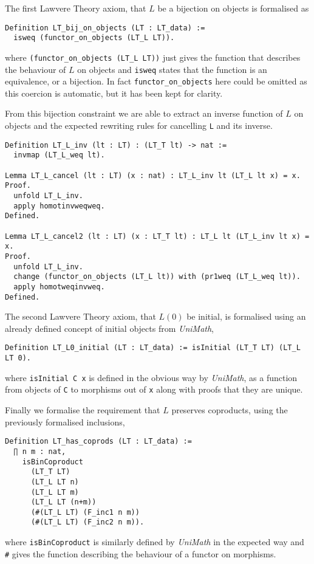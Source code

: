 The first Lawvere Theory axiom, that $L$ be a bijection on objects is formalised
as
\begin{lstlisting}
Definition LT_bij_on_objects (LT : LT_data) := 
  isweq (functor_on_objects (LT_L LT)).
\end{lstlisting}
where \lstinline|(functor_on_objects (LT_L LT))| just gives the function that
describes the behaviour of $L$ on objects and \lstinline|isweq| states that the
function is an equivalence, or a bijection. In fact \lstinline|functor_on_objects|
here could be omitted as this coercion is automatic, but it has been kept for
clarity.

From this bijection constraint we are able to extract an inverse function of $L$
on objects and the expected rewriting rules for cancelling \lstinline|L| and its
inverse.
\begin{lstlisting}
Definition LT_L_inv (lt : LT) : (LT_T lt) -> nat :=
  invmap (LT_L_weq lt).

Lemma LT_L_cancel (lt : LT) (x : nat) : LT_L_inv lt (LT_L lt x) = x.
Proof.
  unfold LT_L_inv.
  apply homotinvweqweq.
Defined.
  
Lemma LT_L_cancel2 (lt : LT) (x : LT_T lt) : LT_L lt (LT_L_inv lt x) = x.
Proof.
  unfold LT_L_inv.
  change (functor_on_objects (LT_L lt)) with (pr1weq (LT_L_weq lt)).
  apply homotweqinvweq.
Defined.
\end{lstlisting}

The second Lawvere Theory axiom, that $L(0)$ be initial, is formalised using an
already defined concept of initial objects from \textit{UniMath},
\begin{lstlisting}
Definition LT_L0_initial (LT : LT_data) := isInitial (LT_T LT) (LT_L LT 0).
\end{lstlisting}
where \lstinline|isInitial C x| is defined in the obvious way by
\textit{UniMath}, as a function from objects of \lstinline|C| to morphisms out
of \lstinline|x| along with proofs that they are unique.

Finally we formalise the requirement that $L$ preserves coproducts, using the
previously formalised inclusions,
\begin{lstlisting}
Definition LT_has_coprods (LT : LT_data) := 
  ∏ n m : nat, 
    isBinCoproduct 
      (LT_T LT)
      (LT_L LT n)
      (LT_L LT m)
      (LT_L LT (n+m))
      (#(LT_L LT) (F_inc1 n m)) 
      (#(LT_L LT) (F_inc2 n m)).
\end{lstlisting}
where \lstinline|isBinCoproduct| is similarly defined by \textit{UniMath} in the
expected way and \lstinline|#| gives the function describing the behaviour of a
functor on morphisms.

